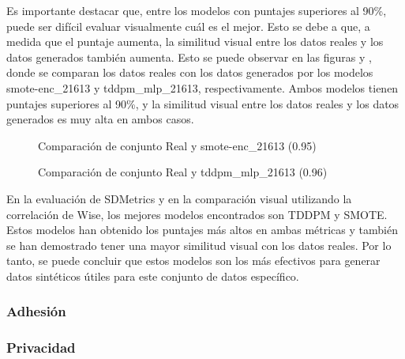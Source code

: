 \newpage 
Es importante destacar que, entre los modelos con puntajes superiores al 90\%, puede ser difícil evaluar visualmente cuál es el mejor. Esto se debe a que, a medida que el puntaje aumenta, la similitud visual entre los datos reales y los datos generados también aumenta. Esto se puede observar en las figuras  y , donde se comparan los datos reales con los datos generados por los modelos smote-enc\_21613 y tddpm\_mlp\_21613, respectivamente. Ambos modelos tienen puntajes superiores al 90\%, y la similitud visual entre los datos reales y los datos generados es muy alta en ambos casos.

\begin{figure}[H]
    \centering
    
    \caption{Comparación de conjunto Real y smote-enc\_21613 (0.95)}
    \label{r-pair-smote-enc_21613}
\end{figure}
\begin{figure}[H]
    \centering
    
    \caption{Comparación de conjunto Real y tddpm\_mlp\_21613 (0.96)}
    \label{r-pair-tddpm_mlp_21613}
\end{figure}

En la evaluación de SDMetrics y en la comparación visual utilizando la correlación de Wise, los mejores modelos encontrados son TDDPM y SMOTE. Estos modelos han obtenido los puntajes más altos en ambas métricas y también se han demostrado tener una mayor similitud visual con los datos reales. Por lo tanto, se puede concluir que estos modelos son los más efectivos para generar datos sintéticos útiles para este conjunto de datos específico.

\subsubsection{Adhesión}

\subsubsection{Privacidad}